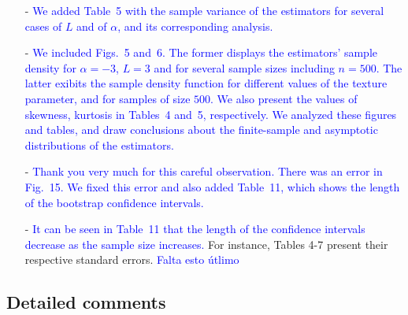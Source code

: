 \documentclass{ar2rc}
\begin{document}
\begin{itemize}
	\item [-] \textcolor{blue}{We added Table~5 with the sample variance of the estimators for several cases of $L$ and of $\alpha$, and its corresponding analysis.}
	
	\item [-] \textcolor{blue}{We included Figs.~5 and~6. 
		The former displays the estimators' sample density for $\alpha=-3$, $L=3$ and for several sample sizes including $n=500$. 
		The latter exibits the sample density function for different values of the texture parameter, and for samples of size $500$. 
	We also present the values of skewness, kurtosis in Tables~4 and~5, respectively. We analyzed these figures and tables, and draw conclusions about the finite-sample and asymptotic distributions of the estimators.}
	
	\item [-] \textcolor{blue}{Thank you very much for this careful observation. There was an error in Fig.~15. We fixed this error and also added Table~11, which shows the length of the bootstrap confidence intervals.}
	
	\item [-] \textcolor{blue}{It can be seen in Table~11 that the length of the confidence intervals decrease as the sample size increases.} 
	For instance, Tables 4-7 present their respective standard errors.
	\textcolor{blue}{Falta esto útlimo}
\end{itemize}




\subsection{Detailed comments}

\end{document}
